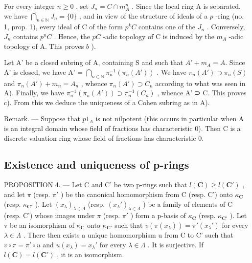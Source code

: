For every integer \(n \geqslant 0\) , set \(J_{n} = C \cap m_{A}^{n}\) . Since the local ring A is separated, we have \(\bigcap_{n \in \mathbb{N}} J_{n} = \{0\}\) , and in view of the structure of ideals of a \(p\) -ring (no. 1, prop. 1), every ideal of C of the form \(p^{k}C\) contains one of the \(J_{n}\) . Conversely, \(J_{n}\) contains \(p^{n}C\) . Hence, the \(pC\) -adic topology of C is induced by the \(m_{A}\) -adic topology of A. This proves \(b\) ).

Let A' be a closed subring of A, containing S and such that \(A' + m_{A} = A\). Since A' is closed, we have A' = \(\bigcap_{n\in\mathbb{N}}\pi_n^{-1}(\pi_n(A'))\) . We have \(\pi_n(A') \supset \pi_n(S)\) and \(\pi_n(A') + m_n = A_n\) , whence \(\pi_n(A') \supset C_n\) according to what was seen in A). Finally, we have \(\pi_n^{-1}(\pi_n(A')) \supset \pi_n^{-1}(C_n)\) , whence A' ⊃ C. This proves c). From this we deduce the uniqueness of a Cohen subring as in A).

Remark. --- Suppose that \(p1_{A}\) is not nilpotent (this occurs in particular when A is an integral domain whose field of fractions has characteristic 0). Then C is a discrete valuation ring whose field of fractions has characteristic 0.

\subsection{Existence and uniqueness of p-rings}

PROPOSITION 4. --- Let C and C' be two p-rings such that \(l(\mathbf{C}) \geqslant l(\mathbf{C}')\) , and let \(\pi\) (resp. \(\pi'\) ) be the canonical homomorphism from C (resp. C') onto \(\kappa_{\mathbf{C}}\) (resp. \(\kappa_{\mathbf{C}'}\) ). Let \((x_{\lambda})_{\lambda \in \Lambda}\) (resp. \((x_{\lambda}')_{\lambda \in \Lambda}\) ) be a family of elements of C (resp. C') whose images under \(\pi\) (resp. \(\pi'\) ) form a p-basis of \(\kappa_{\mathbf{C}}\) (resp. \(\kappa_{\mathbf{C}'}\) ). Let v be an isomorphism of \(\kappa_{\mathbf{C}}\) onto \(\kappa_{\mathbf{C}'}\) such that \(v(\pi(x_{\lambda})) = \pi'(x_{\lambda}')\) for every \(\lambda \in \Lambda\) . There then exists a unique homomorphism u from C to C' such that \(v \circ \pi = \pi' \circ u\) and \(u(x_{\lambda}) = x_{\lambda}'\) for every \(\lambda \in \Lambda\) . It is surjective. If \(l(\mathbf{C}) = l(\mathbf{C}')\) , it is an isomorphism.

